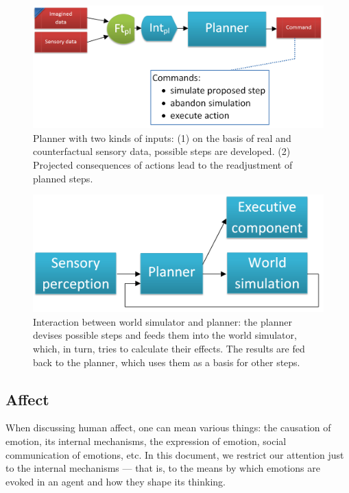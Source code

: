 \documentclass[]{scrartcl}
\begin{document}
\begin{figure}
	\centering
	\includegraphics[width=\textwidth]{figs/planner.png}
	\caption{Planner with two kinds of inputs: (1) on the basis of real and counterfactual sensory data, possible steps are developed. (2) Projected consequences of actions lead to the readjustment of planned steps.}
	\label{fig:planner}
\end{figure}

\begin{figure}
	\centering
	\includegraphics[width=\textwidth]{figs/worldSimulatorPlannerInteraction.png}
	\caption{Interaction between world simulator and planner: the planner devises possible steps and feeds them into the world simulator, which, in turn, tries to calculate their effects. The results are fed back to the planner, which uses them as a basis for other steps.}
	\label{fig:worldSimulatorPlannerInteraction}
\end{figure}

\subsection{Affect}\label{sec:affect}

When discussing human affect, one can mean various things: the causation of emotion, its internal mechanisms, the expression of emotion, social communication of emotions, etc. In this document, we restrict our attention just to the internal mechanisms --- that is, to the means by which emotions are evoked in an agent and how they shape its thinking.
\end{document}

